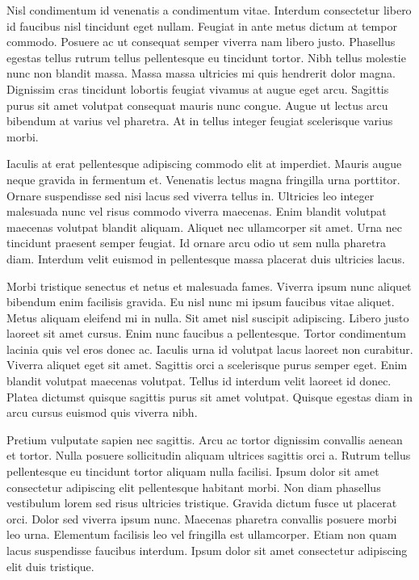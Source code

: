 \documentclass[11pt,a4paper]{article}
\begin{document}
Nisl condimentum id venenatis a condimentum vitae. Interdum consectetur libero id faucibus nisl tincidunt eget nullam. Feugiat in ante metus dictum at tempor commodo. Posuere ac ut consequat semper viverra nam libero justo. Phasellus egestas tellus rutrum tellus pellentesque eu tincidunt tortor. Nibh tellus molestie nunc non blandit massa. Massa massa ultricies mi quis hendrerit dolor magna. Dignissim cras tincidunt lobortis feugiat vivamus at augue eget arcu. Sagittis purus sit amet volutpat consequat mauris nunc congue. Augue ut lectus arcu bibendum at varius vel pharetra. At in tellus integer feugiat scelerisque varius morbi.

Iaculis at erat pellentesque adipiscing commodo elit at imperdiet. Mauris augue neque gravida in fermentum et. Venenatis lectus magna fringilla urna porttitor. Ornare suspendisse sed nisi lacus sed viverra tellus in. Ultricies leo integer malesuada nunc vel risus commodo viverra maecenas. Enim blandit volutpat maecenas volutpat blandit aliquam. Aliquet nec ullamcorper sit amet. Urna nec tincidunt praesent semper feugiat. Id ornare arcu odio ut sem nulla pharetra diam. Interdum velit euismod in pellentesque massa placerat duis ultricies lacus.

Morbi tristique senectus et netus et malesuada fames. Viverra ipsum nunc aliquet bibendum enim facilisis gravida. Eu nisl nunc mi ipsum faucibus vitae aliquet. Metus aliquam eleifend mi in nulla. Sit amet nisl suscipit adipiscing. Libero justo laoreet sit amet cursus. Enim nunc faucibus a pellentesque. Tortor condimentum lacinia quis vel eros donec ac. Iaculis urna id volutpat lacus laoreet non curabitur. Viverra aliquet eget sit amet. Sagittis orci a scelerisque purus semper eget. Enim blandit volutpat maecenas volutpat. Tellus id interdum velit laoreet id donec. Platea dictumst quisque sagittis purus sit amet volutpat. Quisque egestas diam in arcu cursus euismod quis viverra nibh.

Pretium vulputate sapien nec sagittis. Arcu ac tortor dignissim convallis aenean et tortor. Nulla posuere sollicitudin aliquam ultrices sagittis orci a. Rutrum tellus pellentesque eu tincidunt tortor aliquam nulla facilisi. Ipsum dolor sit amet consectetur adipiscing elit pellentesque habitant morbi. Non diam phasellus vestibulum lorem sed risus ultricies tristique. Gravida dictum fusce ut placerat orci. Dolor sed viverra ipsum nunc. Maecenas pharetra convallis posuere morbi leo urna. Elementum facilisis leo vel fringilla est ullamcorper. Etiam non quam lacus suspendisse faucibus interdum. Ipsum dolor sit amet consectetur adipiscing elit duis tristique.
\end{document}
